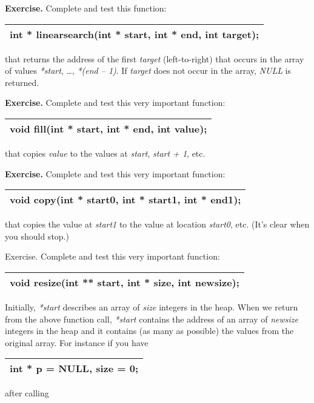 \documentclass[
]{article}
\begin{document}
\textbf{Exercise.} Complete and test this function:

\begin{longtable}[]{@{}l@{}}
\toprule
\endhead
int * linearsearch(int * start, int * end, int target);\tabularnewline
\bottomrule
\end{longtable}

that returns the address of the first \emph{target} (left-to-right) that
occurs in the array of values \emph{*start}, \ldots, \emph{*(end -- 1)}.
If \emph{target} does not occur in the array, \emph{NULL} is returned.

\textbf{Exercise.} Complete and test this very important function:

\begin{longtable}[]{@{}l@{}}
\toprule
\endhead
void fill(int * start, int * end, int value);\tabularnewline
\bottomrule
\end{longtable}

that copies \emph{value} to the values at \emph{start}, \emph{start +
1}, etc.

\textbf{Exercise.} Complete and test this very important function:

\begin{longtable}[]{@{}l@{}}
\toprule
\endhead
void copy(int * start0, int * start1, int * end1);\tabularnewline
\bottomrule
\end{longtable}

that copies the value at \emph{start1} to the value at location
\emph{start0}, etc. (It's clear when you should stop.)

Exercise. Complete and test this very important function:

\begin{longtable}[]{@{}l@{}}
\toprule
\endhead
void resize(int ** start, int * size, int newsize);\tabularnewline
\bottomrule
\end{longtable}

Initially, \emph{*start} describes an array of \emph{size} integers in
the heap. When we return from the above function call, \emph{*start}
contains the address of an array of \emph{newsize} integers in the heap
and it contains (as many as possible) the values from the original
array. For instance if you have

\begin{longtable}[]{@{}l@{}}
\toprule
\endhead
int * p = NULL, size = 0;\tabularnewline
\bottomrule
\end{longtable}

after calling
\end{document}
